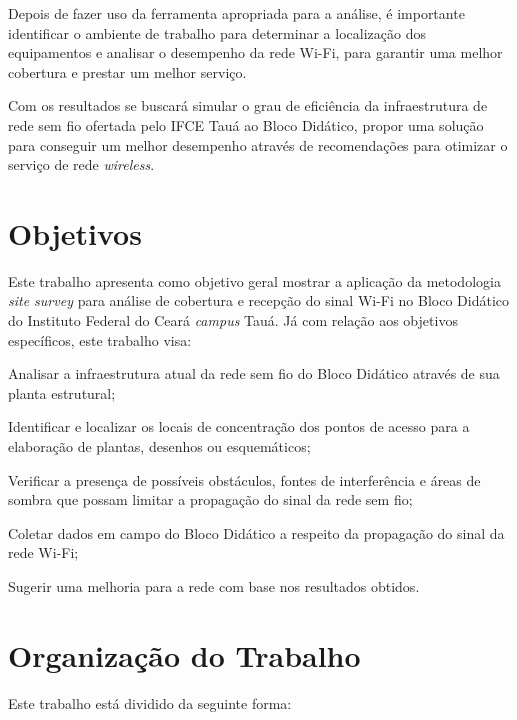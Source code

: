Depois de fazer uso da ferramenta apropriada para a análise, é importante identificar o ambiente de trabalho para determinar a localização dos equipamentos e analisar o desempenho da rede Wi-Fi, para garantir uma melhor cobertura e prestar um melhor serviço.

Com os resultados se buscará simular o grau de eficiência da infraestrutura de rede sem fio ofertada pelo IFCE Tauá ao Bloco Didático, propor uma solução para conseguir um melhor desempenho através de recomendações para otimizar o serviço de rede \textit{wireless}.

\section{Objetivos}
\label{sec:objetivos}

Este trabalho apresenta como objetivo geral mostrar a aplicação da metodologia \textit{site survey} para análise de cobertura e recepção do sinal Wi-Fi no Bloco Didático do Instituto Federal do Ceará \textit{campus} Tauá.
Já com relação aos objetivos específicos, este trabalho visa:
\begin{compactitem}
	\item Analisar a infraestrutura atual da rede sem fio do Bloco Didático através de sua planta estrutural;
	\item Identificar e localizar os locais de concentração dos pontos de acesso para a elaboração de plantas, desenhos ou esquemáticos;
	\item Verificar a presença de possíveis obstáculos, fontes de interferência e áreas de sombra que possam limitar a propagação do sinal da rede sem fio;
	\item Coletar dados em campo do Bloco Didático a respeito da propagação do sinal da rede Wi-Fi;
	\item Sugerir uma melhoria para a rede com base nos resultados obtidos.
\end{compactitem}

\section{Organização do Trabalho}
\label{sec:organnizacao-do-trabalho}

Este trabalho está dividido da seguinte forma:

